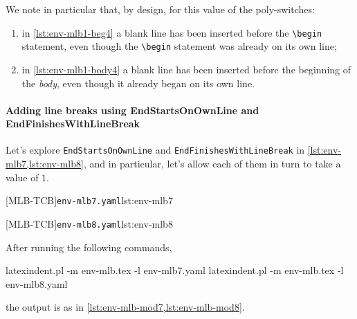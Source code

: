 		\begin{cmhtcbraster}[raster column skip=.1\linewidth]
		\end{cmhtcbraster}

		We note in particular that, by design, for this value of the poly-switches:
		\begin{enumerate}
			\item in \cref{lst:env-mlb1-beg4} a blank line has been inserted before the \lstinline!\begin!
			      statement, even though the \lstinline!\begin! statement was already on its own line;
			\item in \cref{lst:env-mlb1-body4} a blank line has been inserted before the beginning of the
			      \emph{body}, even though it already began on its own line.
		\end{enumerate}

	\paragraph{Adding line breaks using EndStartsOnOwnLine and EndFinishesWithLineBreak}
		Let's explore \texttt{EndStartsOnOwnLine} and \texttt{EndFinishesWithLineBreak} in
		\cref{lst:env-mlb7,lst:env-mlb8}, and in particular, let's allow each of them in turn to
		take a value of $1$. 

		\begin{minipage}{.49\textwidth}
			{\texttt{env-mlb7.yaml}}{lst:env-mlb7}
		\end{minipage}
		\hfill
		\begin{minipage}{.49\textwidth}
			{\texttt{env-mlb8.yaml}}{lst:env-mlb8}
		\end{minipage}

		After running the following commands, 
		\begin{commandshell}
latexindent.pl -m env-mlb.tex -l env-mlb7.yaml
latexindent.pl -m env-mlb.tex -l env-mlb8.yaml
\end{commandshell}
		the output is as in \cref{lst:env-mlb-mod7,lst:env-mlb-mod8}.

